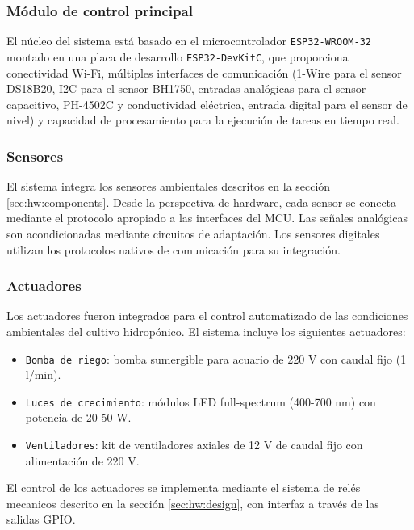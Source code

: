 \subsubsection*{Módulo de control principal}
El núcleo del sistema está basado en el microcontrolador \texttt{ESP32-WROOM-32} montado en una placa de desarrollo \texttt{ESP32-DevKitC}, que proporciona conectividad Wi-Fi, múltiples interfaces de comunicación (1-Wire para el sensor DS18B20, I2C para el sensor BH1750, entradas analógicas para el sensor capacitivo, PH-4502C y conductividad eléctrica, entrada digital para el sensor de nivel) y capacidad de procesamiento para la ejecución de tareas en tiempo real.

\subsubsection*{Sensores}
El sistema integra los sensores ambientales descritos en la sección \ref{sec:hw:components}. Desde la perspectiva de hardware, cada sensor se conecta mediante el protocolo apropiado a las interfaces del MCU. Las señales analógicas son acondicionadas mediante circuitos de adaptación. Los sensores digitales utilizan los protocolos nativos de comunicación para su integración.

\subsubsection*{Actuadores}
Los actuadores fueron integrados para el control automatizado de las condiciones ambientales del cultivo hidropónico. El sistema incluye los siguientes actuadores:

\begin{itemize}
    \item \texttt{Bomba de riego}: bomba sumergible para acuario de 220 V con caudal fijo (1 l/min).
    \item \texttt{Luces de crecimiento}: módulos LED full-spectrum (400-700 nm) con potencia de 20-50 W.
    \item \texttt{Ventiladores}: kit de ventiladores axiales de 12 V de caudal fijo con alimentación de 220 V.
\end{itemize}

El control de los actuadores se implementa mediante el sistema de relés mecanicos descrito en la sección \ref{sec:hw:design}, con interfaz a través de las salidas GPIO.

